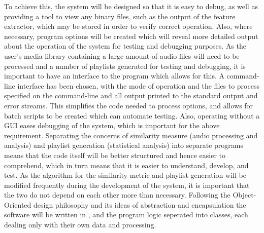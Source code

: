 To achieve this, the system will be designed so that it is easy to debug, as well as providing a tool to view any binary files, such as the output of the feature extractor, which may be stored in order to verify correct operation. Also, where necessary, program options will be created which will reveal more detailed output about the operation of the system for testing and debugging purposes.
\label{text:spec:objective:cli}
As the user's media library containing a large amount of audio files will need to be processed and a number of playlists generated for testing and debugging, it is important to have an interface to the program which allows for this. A command-line interface has been chosen, with the mode of operation and the files to process specified on the command-line and all output printed to the standard output and error streams.
 This simplifies the code needed to process options, and allows for batch scripts to be created which can automate testing. Also, operating without a GUI
 eases debugging of the system, which is important for the above requirement.
Separating the concerns of similarity measure (audio processing and analysis) and playlist generation (statistical analysis) into separate programs means that the code itself will be better structured and hence easier to comprehend, which in turn means that it is easier to understand, develop, and test. As the algorithm for the similarity metric and playlist generation will be modified frequently during the development of the system, it is important that the two do not depend on each other more than necessary. Following the Object-Oriented design philosophy and its ideas of abstraction and encapsulation the software will be written in , and the program logic seperated into classes, each dealing only with their own data and processing.
